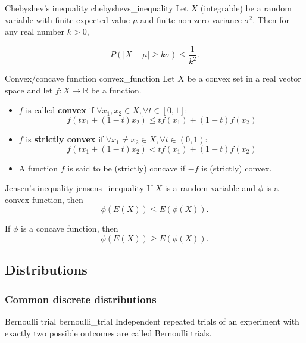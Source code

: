 \begin{lemma}{Chebyshev's inequality \cite{wikipedia_chebyshevs_inequality}}{chebyshevs_inequality}
	Let $X$ (integrable) be a random variable with finite expected value $\mu$ and finite non-zero variance $\sigma^2$. Then for any real number $k > 0$,

	$$ P(\lvert X-\mu \rvert \geq k \sigma) \leq \frac {1}{k^{2}} . $$
\end{lemma}

\begin{definition}{Convex/concave function \cite{math2901_notes}}{convex_function}
	Let $X$ be a convex set in a real vector space and let $f : X \to \mathbb{R}$ be a function.
	\begin{itemize}
		\item $f$ is called \textbf{convex} if $\forall x_1, x_2 \in X, \forall t \in [0, 1]$:
		$$ f(t x_1 + (1 - t) x_2) \leq t f(x_1) + (1 - t) f(x_2) $$

		\item $f$ is \textbf{strictly convex} if $\forall x_1 \neq x_2 \in X, \forall t \in (0, 1)$:
		$$ f(t x_1 + (1 - t) x_2) < t f(x_1) + (1 - t) f(x_2) $$

		\item A function $f$ is said to be (strictly) concave if $-f$ is (strictly) convex.
	\end{itemize}	
\end{definition}

\begin{lemma}{Jensen's inequality \cite{wikipedia_jensens_inequality}}{jensens_inequality}
	If $X$ is a random variable and $\phi$ is a convex function, then
	$$ \phi(E(X)) \leq E(\phi(X)) . $$

	If $\phi$ is a concave function, then
	$$ \phi(E(X)) \geq E(\phi(X)) . $$
\end{lemma}

\subsection{Distributions}

\subsubsection{Common discrete distributions}

\begin{definition}{Bernoulli trial \cite{wikipedia_bernoulli_trial}}{bernoulli_trial}
	Independent repeated trials of an experiment with exactly two possible outcomes are called Bernoulli trials.
\end{definition}

